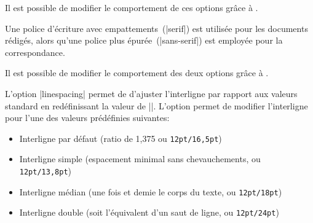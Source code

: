 \begin{developer}
Il est possible de modifier le comportement de ces options grâce à .
\end{developer}

\begin{noprint}
\end{noprint}

Une police d'écriture avec empattements~(|serif|) est utilisée pour les documents rédigés, alors qu'une police plus épurée~(|sans-serif|) est employée pour la correspondance.

\begin{developer}
Il est possible de modifier le comportement des deux options grâce à .
\end{developer}

\begin{noprint}
\end{noprint}

L'option |linespacing| permet de d'ajuster l'interligne par rapport aux valeurs standard en redéfinissant la valeur de |\baselinestretch|. L'option permet de modifier l'interligne pour l'une des valeurs prédéfinies suivantes:

\begin{itemize}
\item Interligne par défaut (ratio de 1,375 ou \texttt{12pt/16,5pt})
\item Interligne simple (espacement minimal sans chevauchements, ou \texttt{12pt/13,8pt})
\item Interligne médian (une fois et demie le corps du texte, ou \texttt{12pt/18pt})
\item Interligne double (soit l'équivalent d'un saut de ligne, ou \texttt{12pt/24pt})
\end{itemize}


